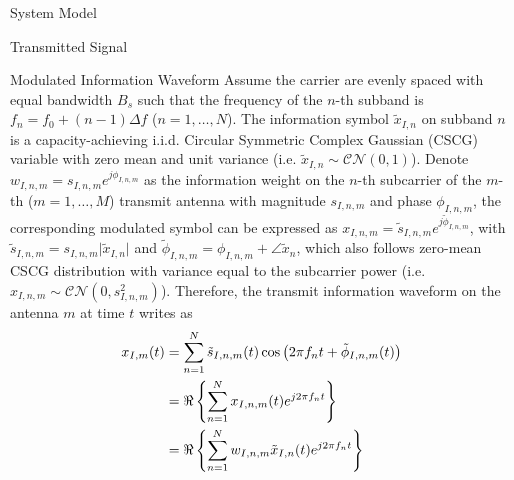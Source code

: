 \documentclass{IEEEtran}
\begin{document}
\begin{section} {System Model}
\begin{subsection} {Transmitted Signal}
            \begin{subsubsection} {Modulated Information Waveform}
                Assume the carrier are evenly spaced with equal bandwidth $B_s$ such that the frequency of the $n$-th subband is $f_n = f_0+(n-1) \Delta f$ ($n = 1,\dots,N$). The information symbol $\tilde{x}_{I,n}$ on subband $n$ is a capacity-achieving i.i.d. Circular Symmetric Complex Gaussian (CSCG) variable with zero mean and unit variance (i.e. $\tilde{x}_{I,n} \sim \mathcal{CN}(0,1)$). Denote $w_{I,n,m} = s_{I,n,m} e^{j\phi_{I,n,m}}$ as the information weight on the $n$-th subcarrier of the $m$-th ($m = 1,\dots,M$) transmit antenna with magnitude $s_{I,n,m}$ and phase $\phi_{I,n,m}$, the corresponding modulated symbol can be expressed as $x_{I,n,m} = \tilde{s}_{I,n,m} e^{j\tilde{\phi}_{I,n,m}}$, with $\tilde{s}_{I,n,m} = s_{I,n,m} \lvert\tilde{x}_{I,n}\rvert$ and $\tilde{\phi}_{I,n,m} = \phi_{I,n,m} + \angle{\tilde{x}_n}$, which also follows zero-mean CSCG distribution with variance equal to the subcarrier power (i.e. $x_{I,n,m} \sim \mathcal{CN}(0,s_{I,n,m}^2)$). Therefore, the transmit information waveform on the antenna $m$ at time $t$ writes as
                \begin{equation} \label{eq:x_{I,m}(t)}
                    \begin{split}
                        x_{I,m}(t)
                        &= \sum_{n=1}^{N} \tilde{s}_{I,n,m}(t) \cos \left( 2 \pi f_n t + \tilde{\phi}_{I,n,m}(t) \right) \\
                        &= \Re \left\{ \sum_{n=1}^{N} x_{I,n,m}(t) e^{j2 \pi f_n t} \right\} \\
                        &= \Re \left\{ \sum_{n=1}^{N} w_{I,n,m} \tilde{x}_{I,n}(t) e^{j2 \pi f_n t} \right\}
                    \end{split}
                \end{equation}
            \end{subsubsection}


\end{subsection}
\end{section}
\end{document}
